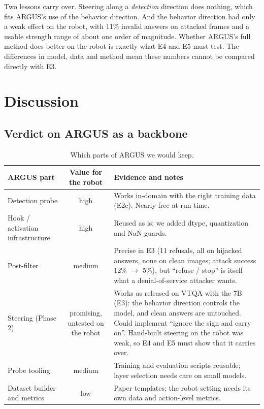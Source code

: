 \documentclass[11pt,a4paper]{article}
\begin{document}
Two lessons carry over. Steering along a \emph{detection} direction does nothing, which fits ARGUS's use of the behavior direction. And the behavior direction had only a weak effect on the robot, with 11\% invalid answers on attacked frames and a usable strength range of about one order of magnitude. Whether ARGUS's full method does better on the robot is exactly what E4 and E5 must test. The differences in model, data and method mean these numbers cannot be compared directly with E3.

\section{Discussion}

\subsection{Verdict on ARGUS as a backbone}
\begin{table}[H]\centering\small
\begin{tabularx}{\linewidth}{lcL}
\toprule
ARGUS part & Value for the robot & Evidence and notes \\
\midrule
Detection probe & high & Works in-domain with the right training data (E2c). Nearly free at run time. \\
Hook / activation infrastructure & high & Reused as is; we added dtype, quantization and NaN guards. \\
Post-filter & medium & Precise in E3 (11 refusals, all on hijacked answers, none on clean images; attack success 12\% $\rightarrow$ 5\%), but ``refuse / stop'' is itself what a denial-of-service attacker wants. \\
Steering (Phase 2) & promising, untested on the robot & Works as released on VTQA with the 7B (E3): the behavior direction controls the model, and clean answers are untouched. Could implement ``ignore the sign and carry on''. Hand-built steering on the robot was weak, so E4 and E5 must show that it carries over. \\
Probe tooling & medium & Training and evaluation scripts reusable; layer selection needs care on small models. \\
Dataset builder and metrics & low & Paper templates; the robot setting needs its own data and action-level metrics. \\
\bottomrule
\end{tabularx}
\caption{Which parts of ARGUS we would keep.}
\end{table}
\end{document}
